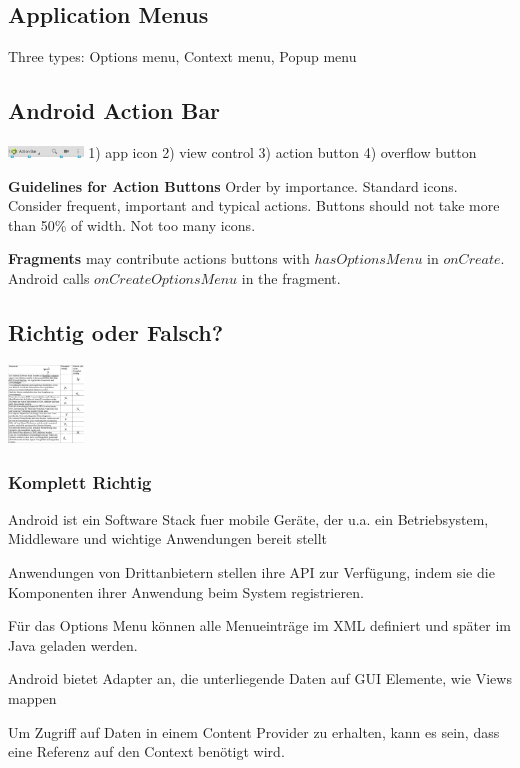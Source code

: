 \subsection{Application Menus}
Three types: Options menu, Context menu, Popup menu

\subsection{Android Action Bar}
\includegraphics[width=0.15\textwidth]{android/actionbar.png}
1) app icon
2) view control
3) action button
4) overflow button

\textbf{Guidelines for Action Buttons}
Order by importance. Standard icons. Consider frequent, important and typical
actions. Buttons should not take more than 50\% of width. Not too many icons.

\textbf{Fragments} may contribute actions buttons with $hasOptionsMenu$ in
$onCreate$. Android calls $onCreateOptionsMenu$ in the fragment.

\subsection{Richtig oder Falsch?}
\includegraphics[width=0.15\textwidth]{android/bskon_1.png}

\subsubsection{Komplett Richtig}
Android ist ein Software Stack fuer mobile Geräte, der u.a. ein Betriebsystem,
Middleware und wichtige Anwendungen bereit stellt

Anwendungen von Drittanbietern stellen ihre API zur Verfügung, indem sie die
Komponenten ihrer Anwendung beim System registrieren.

Für das Options Menu können alle Menueinträge im XML definiert und später im
Java geladen werden.

Android bietet Adapter an, die unterliegende Daten auf GUI Elemente, wie Views
mappen

Um Zugriff auf Daten in einem Content Provider zu erhalten, kann es sein, dass
eine Referenz auf den Context benötigt wird.

